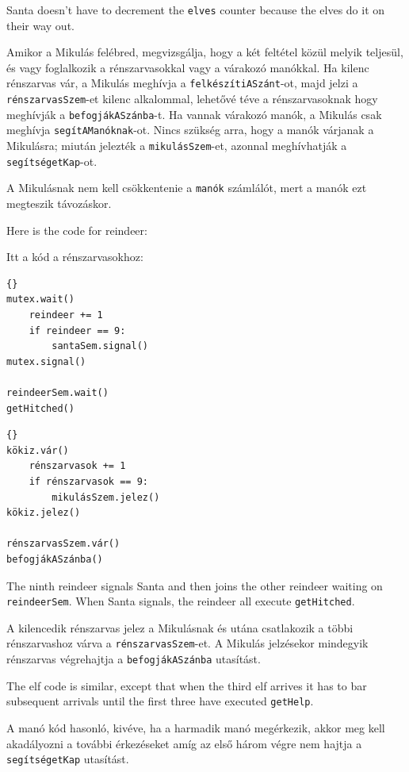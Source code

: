 \documentclass{book}
\begin{document}
Santa doesn't have to decrement
the {\tt elves} counter because the elves do it on their way
out.

Amikor a Mikulás felébred, megvizsgálja, hogy a két feltétel közül melyik teljesül,
és vagy foglalkozik a rénszarvasokkal vagy a várakozó manókkal. Ha kilenc
rénszarvas vár, a Mikulás meghívja a {\tt felkészítiASzánt}-ot, majd jelzi a
{\tt rénszarvasSzem}-et kilenc alkalommal, lehetővé téve a rénszarvasoknak
hogy meghívják a {\tt befogjákASzánba}-t. Ha vannak várakozó manók, a Mikulás csak
meghívja {\tt segítAManóknak}-ot. Nincs szükség arra, hogy a manók várjanak a
Mikulásra; miután jelezték a {\tt mikulásSzem}-et, azonnal meghívhatják
a {\tt segítségetKap}-ot.

A Mikulásnak nem kell csökkentenie a {\tt manók} számlálót, mert a manók ezt megteszik távozáskor.

Here is the code for reindeer:

Itt a kód a rénszarvasokhoz:


\begin{lstlisting}[title={Santa problem solution (reindeer)}]{}
mutex.wait()
    reindeer += 1
    if reindeer == 9:
        santaSem.signal()
mutex.signal()

reindeerSem.wait()
getHitched()
\end{lstlisting}

\begin{lstlisting}[title={Mikulás probléma megoldás (rénszarvasok)}]{}
kökiz.vár()
    rénszarvasok += 1
    if rénszarvasok == 9:
        mikulásSzem.jelez()
kökiz.jelez()

rénszarvasSzem.vár()
befogjákASzánba()
\end{lstlisting}


The ninth reindeer signals Santa and then joins the other
reindeer waiting on {\tt reindeerSem}.  When Santa signals, the
reindeer all execute {\tt getHitched}.

A kilencedik rénszarvas jelez a Mikulásnak és utána csatlakozik a többi
rénszarvashoz várva a {\tt rénszarvasSzem}-et. A Mikulás jelzésekor mindegyik
rénszarvas végrehajtja a {\tt befogjákASzánba} utasítást.

The elf code is similar, except that when the third elf arrives
it has to bar subsequent arrivals until the first three have
executed {\tt getHelp}.

A manó kód hasonló, kivéve, ha a harmadik manó megérkezik, akkor meg
kell akadályozni a további érkezéseket amíg az első három végre nem hajtja
a {\tt segítségetKap} utasítást.
\end{document}
